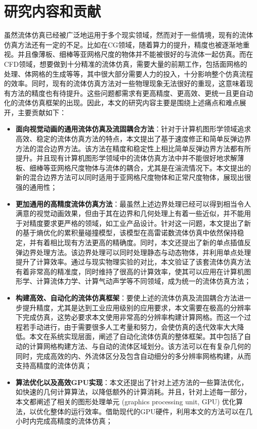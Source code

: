 \section{研究内容和贡献}
虽然流体仿真已经被广泛地运用于多个现实领域，然而对于一些情境，现有的流体仿真方法还有一定的不足。比如在CG领域，随着算力的提升，精度也被逐渐地重视。并且像薄板、细棒等亚网格尺度的物体并不能被很好的与流体一起仿真。而在CFD领域，想要做到十分精准的流体仿真，需要大量的前期工作，包括面网格的处理、体网格的生成等等，其中很大部分需要人力的投入，十分影响整个仿真流程的效率。同时，现有的流体仿真方法对一些物理现象无法很好的重现，这意味着现有方法的精度也有待提升。这些问题都需求有更高精度、更高效、更统一且更自动化的流体仿真框架的出现。因此，本文的研究内容主要是围绕上述痛点和难点展开，主要贡献如下：

\begin{itemize}
    \item \textbf{面向视觉动画的通用流体仿真及流固耦合方法}：针对于计算机图形学领域追求高效、稳定的流体仿真方法的特点，本文提出了基于速度修正和简单反弹边界方法的混合边界方法。该方法在精度和稳定性上相比简单反弹边界方法都有所提升。并且现有计算机图形学领域中的流体仿真方法中并不能很好地求解薄板、细棒等亚网格尺度物体与流体的耦合，尤其是在湍流情况下。本文提出的新的混合边界方法可以同时适用于亚网格尺度物体和正常尺度物体，展现出很强的通用性；
    \item \textbf{更加通用的高精度流体仿真方法}：最虽然上述边界处理已经可以得到相当令人满意的视觉动画效果，但由于其在边界和几何处理上有着一些近似，并不能用于对精度要求更严格的领域，如工业产品设计。针对这一问题，本文提出了新的基于熵优化的累积量碰撞模型，该模型在高雷诺数流体仿真中依然保持稳定，并有着相比现有方法更高的精确度。同时，本文还提出了新的单点插值反弹边界处理方法。该边界处理可以同时处理静态与动态物体，并利用单点处理提升了计算效率。通过与现实物理实验的对比，本文验证了该套流体仿真方法有着非常高的精准度，同时维持了很高的计算效率，使其可以应用在计算机图形学、计算流体力学、计算气动声学等不同领域，成为统一的流体仿真方法；
    \item \textbf{构建高效、自动化的流体仿真框架}：要使上述的流体仿真及流固耦合方法进一步提升精度，尤其是达到工业应用级别的应用要求，本文需要在极高的分辨率下完成仿真，这势必要求本文使用非常高的分辨率构建计算网格。而这一个过程若手动进行，由于需要很多人工考量和努力，会使仿真的迭代效率大大降低。本文在系统实现层面，阐述了自动化流体仿真的整体框架。其中包括了自动的计算网格构建方法、与自动的流体区域划分。该方法可以在有复杂几何的同时，完成高效的内、外流体区分及包含自动细分的多分辨率网格构建，从而支持高精度的流体仿真；
    \item \textbf{算法优化以及高效GPU实现}：本文还提出了针对上述方法的一些算法优化，如快速的几何计算算法，以降低额外的计算消耗。并且，针对上述每一部分，本文都阐述了相关的图形处理单元 (graphics processing unit, GPU) 优化算法，以优化整体的运行效率。借助现代的GPU硬件，利用本文的方法可以在几小时内完成高精度的流体仿真；

\end{itemize}
